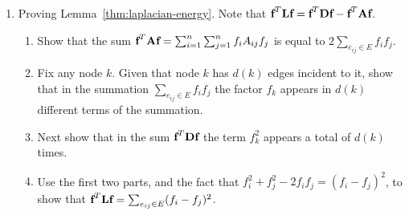  \begin{enumerate}[label=\ref{sec:fundamentals:eigen2}.\arabic*]
   \item Proving Lemma~\ref{thm:laplacian-energy}. Note that $\textbf{f}^T \textbf{L} \textbf{f} = \textbf{f}^T\textbf{D}\textbf{f} - \textbf{f}^T \textbf{A} \textbf{f}$.
   \begin{enumerate}
     \item Show that the sum $\textbf{f}^T \textbf{A} \textbf{f} = \sum_{i=1}^n \sum_{j=1}^n  f_i A_{ij} f_j$ is equal to $2 \sum_{e_{ij} \in E} f_i f_j $.
     \item Fix any node $k$. Given that node $k$ has $d(k)$ edges incident to it, show that in the summation $\sum_{e_{ij} \in E} f_i f_j $ the factor $f_k$ appears in $d(k)$ different terms of the summation.
     \item Next show that in the sum $\textbf{f}^T\textbf{D}\textbf{f}$ the term $f_k^2$ appears a total of $d(k)$ times.
     \item Use the first two parts, and the fact that $f_i^2 + f_j^2 - 2f_i f_j = (f_i - f_j)^2$, to show that $\textbf{f}^T\textbf{L}\textbf{f} = \sum_{e_{ij} \in E }  (f_i - f_j)^2$.
   \end{enumerate}

 \end{enumerate}
